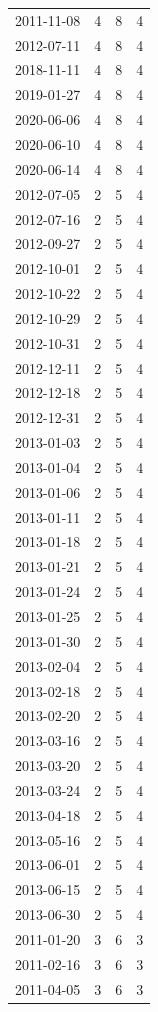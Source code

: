 \begin{tabular}{lrrr}
2011-11-08 & 4 & 8 & 4 \\
2012-07-11 & 4 & 8 & 4 \\
2018-11-11 & 4 & 8 & 4 \\
2019-01-27 & 4 & 8 & 4 \\
2020-06-06 & 4 & 8 & 4 \\
2020-06-10 & 4 & 8 & 4 \\
2020-06-14 & 4 & 8 & 4 \\
2012-07-05 & 2 & 5 & 4 \\
2012-07-16 & 2 & 5 & 4 \\
2012-09-27 & 2 & 5 & 4 \\
2012-10-01 & 2 & 5 & 4 \\
2012-10-22 & 2 & 5 & 4 \\
2012-10-29 & 2 & 5 & 4 \\
2012-10-31 & 2 & 5 & 4 \\
2012-12-11 & 2 & 5 & 4 \\
2012-12-18 & 2 & 5 & 4 \\
2012-12-31 & 2 & 5 & 4 \\
2013-01-03 & 2 & 5 & 4 \\
2013-01-04 & 2 & 5 & 4 \\
2013-01-06 & 2 & 5 & 4 \\
2013-01-11 & 2 & 5 & 4 \\
2013-01-18 & 2 & 5 & 4 \\
2013-01-21 & 2 & 5 & 4 \\
2013-01-24 & 2 & 5 & 4 \\
2013-01-25 & 2 & 5 & 4 \\
2013-01-30 & 2 & 5 & 4 \\
2013-02-04 & 2 & 5 & 4 \\
2013-02-18 & 2 & 5 & 4 \\
2013-02-20 & 2 & 5 & 4 \\
2013-03-16 & 2 & 5 & 4 \\
2013-03-20 & 2 & 5 & 4 \\
2013-03-24 & 2 & 5 & 4 \\
2013-04-18 & 2 & 5 & 4 \\
2013-05-16 & 2 & 5 & 4 \\
2013-06-01 & 2 & 5 & 4 \\
2013-06-15 & 2 & 5 & 4 \\
2013-06-30 & 2 & 5 & 4 \\
2011-01-20 & 3 & 6 & 3 \\
2011-02-16 & 3 & 6 & 3 \\
2011-04-05 & 3 & 6 & 3 \\

\end{tabular}
